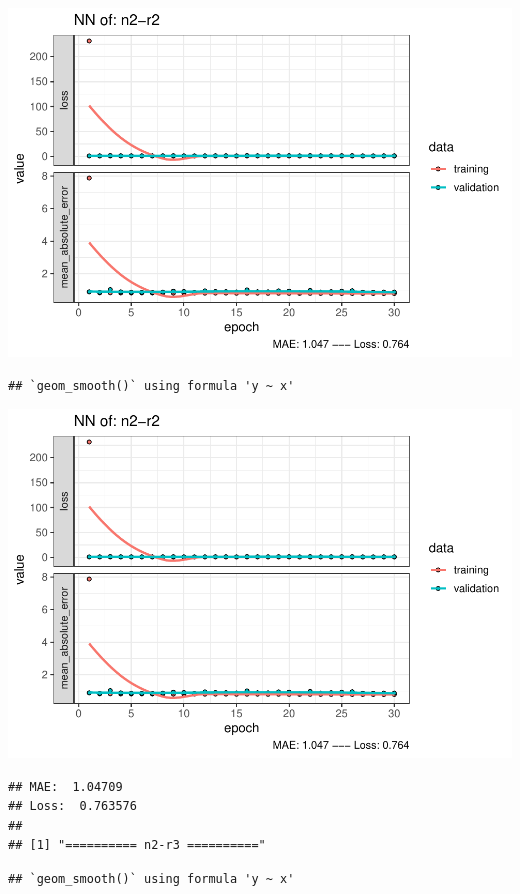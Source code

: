 \documentclass[
]{article}
\begin{document}
\includegraphics{project-code_files/figure-latex/unnamed-chunk-18-19.pdf}

\begin{verbatim}
## `geom_smooth()` using formula 'y ~ x'
\end{verbatim}

\includegraphics{project-code_files/figure-latex/unnamed-chunk-18-20.pdf}

\begin{verbatim}
## MAE:  1.04709
## Loss:  0.763576 
## 
## [1] "========== n2-r3 =========="
\end{verbatim}

\begin{verbatim}
## `geom_smooth()` using formula 'y ~ x'
\end{verbatim}
\end{document}
